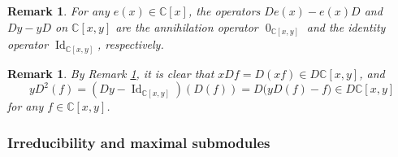 \documentclass[12pt,reqno]{amsart}
\def\C{\mathbb{C}}
\numberwithin{equation}{section}
\newtheorem{rema}[theo]{Remark}
\begin{document}
\begin{rema}\label{re 6.1}
    For any $e(x)\in\C[x]$, the operators $De(x)-e(x)D$ and $Dy-yD$ on $\C[x,y]$ are the annihilation operator $\operatorname{0}_{\C[x,y]}$ and the identity operator $\operatorname{Id}_{\C[x,y]}$, respectively.
\end{rema}


    

\begin{rema}\label{rem 6.1}
    By Remark \ref{re 6.1}, it is clear that $xDf=D(xf)\in D\C[x,y]$, 
and
\[
   yD^2(f)= (Dy-{\operatorname{Id}_{\C[x,y]}})(D(f))=D\Big(yD(f)-f\Big) \in D\C[x,y]
\]
for any $f\in\C[x,y]$. 
\end{rema}



\subsubsection{Irreducibility and maximal submodules}
\end{document}
